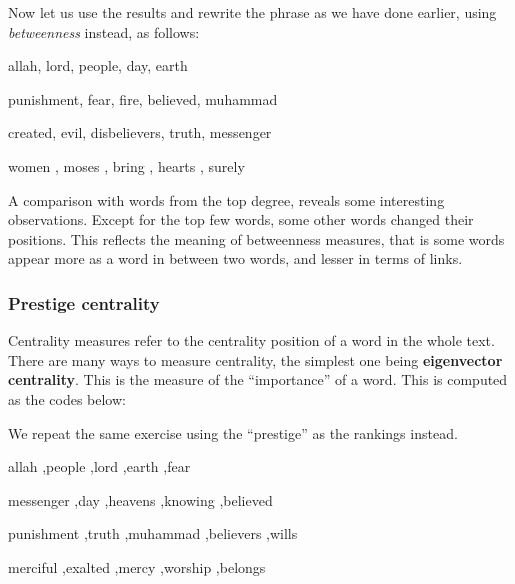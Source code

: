 \documentclass[
]{article}
\newenvironment{Shaded}{\begin{snugshade}}{\end{snugshade}}
\newcommand{\FunctionTok}[1]{\textcolor[rgb]{0.13,0.29,0.53}{\textbf{#1}}}
\newcommand{\NormalTok}[1]{#1}
\newcommand{\OtherTok}[1]{\textcolor[rgb]{0.56,0.35,0.01}{#1}}
\newcommand{\SpecialCharTok}[1]{\textcolor[rgb]{0.81,0.36,0.00}{\textbf{#1}}}
\begin{document}
\normalsize

Now let us use the results and rewrite the phrase as we have done earlier, using \emph{betweenness} instead, as follows:

allah, lord, people, day, earth

punishment, fear, fire, believed, muhammad

created, evil, disbelievers, truth, messenger

women , moses , bring , hearts , surely

A comparison with words from the top degree, reveals some interesting observations. Except for the top few words, some other words changed their positions. This reflects the meaning of betweenness measures, that is some words appear more as a word in between two words, and lesser in terms of links.

\hypertarget{prestige-centrality}{%
\subsubsection{Prestige centrality}\label{prestige-centrality}}

Centrality measures refer to the centrality position of a word in the whole text. There are many ways to measure centrality, the simplest one being \textbf{eigenvector centrality}. This is the measure of the ``importance'' of a word. This is computed as the codes below:

\footnotesize

\begin{Shaded}
\end{Shaded}

\normalsize

We repeat the same exercise using the ``prestige'' as the rankings instead.

allah ,people ,lord ,earth ,fear

messenger ,day ,heavens ,knowing ,believed

punishment ,truth ,muhammad ,believers ,wills

merciful ,exalted ,mercy ,worship ,belongs
\end{document}
